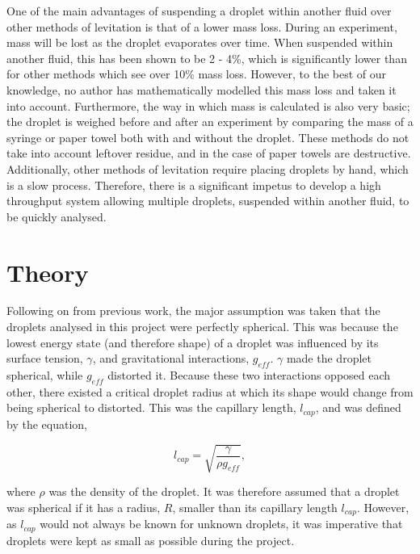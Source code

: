 \documentclass{physics_article_B}
\begin{document}
    \newpage One of the main advantages of suspending a droplet within another fluid over other methods of levitation is that of a lower mass loss. During an experiment, mass will be lost as the droplet evaporates over time. When suspended within another fluid, this has been shown\cite{harrold2} to be 2 - 4\%, which is significantly lower than for other methods which see over 10\% mass loss. However, to the best of our knowledge, no author has mathematically modelled this mass loss and taken it into account. Furthermore, the way in which mass is calculated is also very basic; the droplet is weighed before and after an experiment by comparing the mass of a syringe or paper towel both with and without the droplet\cite{temperton}. These methods do not take into account leftover residue, and in the case of paper towels are destructive. Additionally, other methods of levitation require placing droplets by hand, which is a slow process. Therefore, there is a significant impetus to develop a high throughput system allowing multiple droplets, suspended within another fluid, to be quickly analysed.

\section{Theory\label{sect:theory}}

    Following on from previous work\cite{temperton}, the major assumption was taken that the droplets analysed in this project were perfectly spherical. This was because the lowest energy state (and therefore shape) of a droplet was influenced by its surface tension, $\gamma$, and gravitational interactions, $g_{eff}$. $\gamma$ made the droplet spherical, while $g_{eff}$ distorted it. Because these two interactions opposed each other, there existed a critical droplet radius at which its shape would change from being spherical to distorted. This was the capillary length, $l_{cap}$, and was defined by the equation\cite{temperton},
        
        \begin{equation} 
        \label{eq:lcap}
            l_{cap} = \sqrt{\frac{\gamma }{\rho g_{eff} }}, 
        \end{equation}
    
    where $\rho$ was the density of the droplet. It was therefore assumed that a droplet was spherical if it has a radius, $R$, smaller than its capillary length $l_{cap}$. However, as $l_{cap}$ would not always be known for unknown droplets, it was imperative that droplets were kept as small as possible during the project. 
\end{document}
